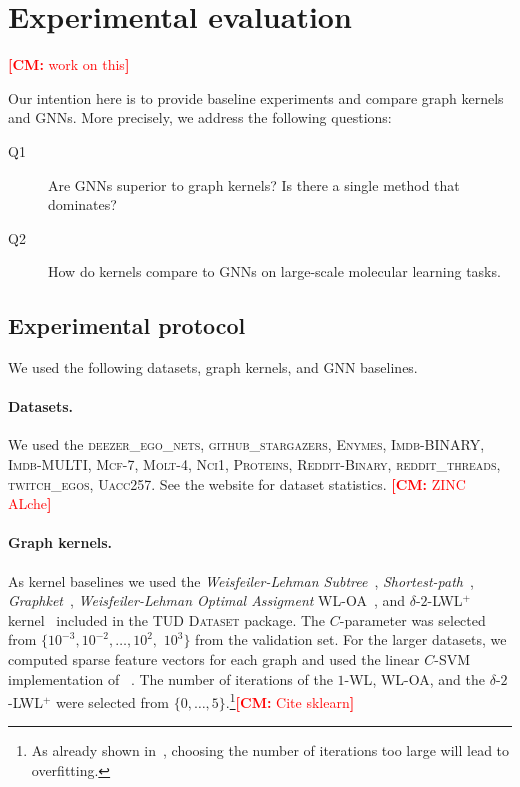 \documentclass{article}
\theoremstyle{definition}
\newcommand{\new}[1]{\emph{#1}}
\newcommand{\cm}[1]{{{\textcolor{red}{\textbf{[CM:} {#1}\textbf{]}}}}}
\begin{document}
\section{Experimental evaluation}

\cm{work on this}

Our intention here is to provide baseline experiments and compare graph kernels and GNNs. More precisely, we address the following questions:
\begin{description}
	\item[Q1] Are GNNs superior to graph kernels? Is there a single method that dominates?
	\item[Q2] How do kernels compare to GNNs on large-scale molecular learning tasks.
\end{description}

\subsection{Experimental protocol}

We used the following datasets, graph kernels, and GNN baselines.

\paragraph{Datasets.} We used the \textsc{deezer\_ego\_nets}, \textsc{github\_stargazers}, \textsc{Enymes},
\textsc{Imdb-BINARY}, \textsc{Imdb-MULTI}, \textsc{Mcf-7}, \textsc{Molt-4},	\textsc{Nci1}, \textsc{Proteins},
\textsc{Reddit-Binary},	\textsc{reddit\_threads}, \textsc{twitch\_egos}, \textsc{Uacc257}. See the website for dataset statistics.
\cm{ZINC ALche}

\paragraph{Graph kernels.} As kernel baselines we used the \new{Weisfeiler-Lehman Subtree}~\cite{She+2011}, \new{Shortest-path}~\cite{Bor+2005}, \new{Graphket}~\cite{She+2009}, \new{Weisfeiler-Lehman Optimal Assigment} \textsc{WL-OA}~\cite{Kri+2016}, and $\delta$-$2$-LWL$^+$ kernel~\cite{Mor+2019b} included in the \textsc{TUD Dataset} package. The $C$-parameter was selected from $\{10^{-3}, 10^{-2}, \dotsc, 10^{2},$ $10^{3}\}$ from the validation set. For the larger datasets, we computed sparse feature vectors for each graph and used the linear $C$-SVM implementation of ~\cite{Fan+2008}. The number of iterations of the \textsc{$1$-WL}, \textsc{WL-OA}, and the  $\delta$-$2$-LWL$^+$ were selected from $\{0,\dotsc,5\}$.\footnote{As already shown in~\cite{She+2011}, choosing the number of iterations too large will lead to overfitting.}\cm{Cite sklearn}
\end{document}
